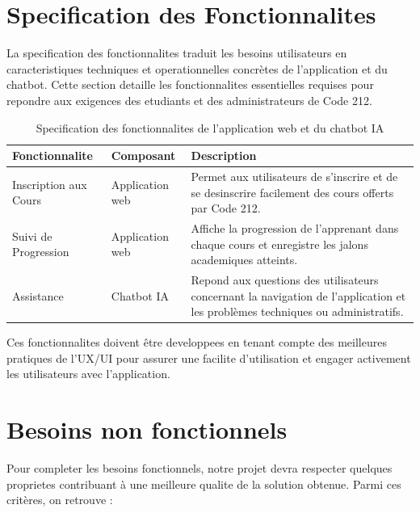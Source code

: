 \documentclass[a4paper, 11pt, openany]{report}
\begin{document}


\section{Specification des Fonctionnalites}
La specification des fonctionnalites traduit les besoins utilisateurs en caracteristiques techniques et operationnelles concrètes de l'application et du chatbot. Cette section detaille les fonctionnalites essentielles requises pour repondre aux exigences des etudiants et des administrateurs de Code 212.

\begin{table}[htp]
\caption{Specification des fonctionnalites de l'application web et du chatbot IA}
\centering
\begin{tabular}{|m{4cm}|m{5cm}|m{7cm}|}
\hline
\textbf{Fonctionnalite} & \textbf{Composant} & \textbf{Description} \\ \hline
Inscription aux Cours & Application web & Permet aux utilisateurs de s'inscrire et de se desinscrire facilement des cours offerts par Code 212. \\ \hline
Suivi de Progression & Application web & Affiche la progression de l'apprenant dans chaque cours et enregistre les jalons academiques atteints. \\ \hline
Assistance & Chatbot IA & Repond aux questions des utilisateurs concernant la navigation de l'application et les problèmes techniques ou administratifs. \\ \hline
\end{tabular}
\label{tab:functional_specs}
\end{table}

Ces fonctionnalites doivent être developpees en tenant compte des meilleures pratiques de l'UX/UI pour assurer une facilite d'utilisation et engager activement les utilisateurs avec l'application.

\section{Besoins non fonctionnels}

Pour completer les besoins fonctionnels, notre projet devra respecter quelques proprietes contribuant à une meilleure qualite de la solution obtenue. Parmi ces critères, on retrouve :
\end{document}
